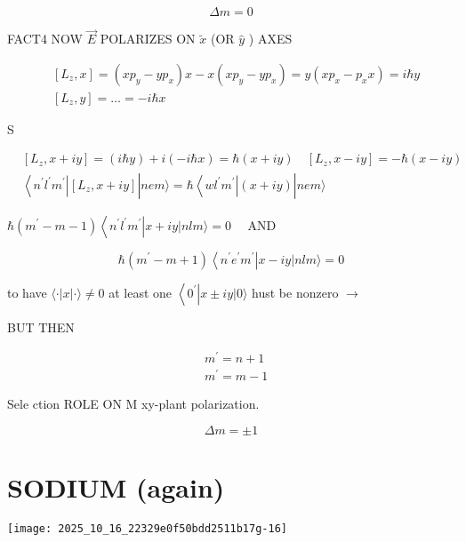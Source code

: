 $$
\Delta m=0
$$

FACT4 NOW $\vec{E}$ POLARIZES ON $\tilde{x}$ (OR $\hat{y}$ ) AXES

$$
\begin{aligned}
& {\left[L_{z}, x\right]=\left(x p_{y}-y p_{x}\right) x-x\left(x p_{y}-y p_{x}\right)=y\left(x p_{x}-p_{x} x\right)=i \hbar y} \\
& {\left[L_{z}, y\right]=\ldots=-i \hbar x}
\end{aligned}
$$

S

$$
\begin{aligned}
& {\left[L_{z}, x+i y\right]=(i \hbar y)+i(-i \hbar x)=\hbar(x+i y) \quad\left[L_{z}, x-i y\right]=-\hbar(x-i y)} \\
& \left\langle n^{\prime} l^{\prime} m^{\prime}\right|\left[L_{z}, x+i y\right]|n e m\rangle=\hbar\left\langle w l^{\prime} m^{\prime}\right|(x+i y)|n e m\rangle
\end{aligned}
$$

$\hbar\left(m^{\prime}-m-1\right)\left\langle n^{\prime} l^{\prime} m^{\prime}\right| x+i y|n l m\rangle=0 \quad$ AND

$$
\hbar\left(m^{\prime}-m+1\right)\left\langle n^{\prime} e^{\prime} m^{\prime}\right| x-i y|n l m\rangle=0
$$

to have $\langle\cdot| x|\cdot\rangle \neq 0$ at least one $\left\langle 0^{\prime}\right| x \pm i y|0\rangle$ hust be nonzero $\rightarrow$

BUT THEN

$$
\begin{aligned}
& m^{\prime}=n+1 \\
& m^{\prime}=m-1
\end{aligned}
$$

Sele ction ROLE ON M xy-plant polarization.

$$
\Delta m= \pm 1
$$

\section*{SODIUM (again)}
\begin{center}
\texttt{[image: 2025\_10\_16\_22329e0f50bdd2511b17g-16]}
\end{center}
